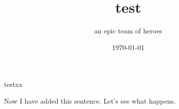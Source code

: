 \documentclass[12pt]{article}
\begin{document}
\title{test}
\author{an epic team of heroes}
\date{\today}
\maketitle

testxx

Now I have added this sentence. Let's see what happens.
\end{document}
